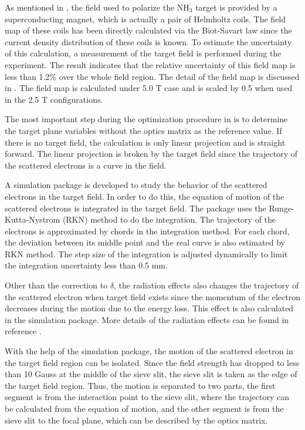 As mentioned in , the field used to polarize the NH${}_3$ target is provided by a superconducting magnet, which is actually a pair of Helmholtz coils. The field map of these coils has been directly calculated via the Biot-Savart law since the current density distribution of these coils is known. To estimate the uncertainty of this calculation, a measurement of the target field is performed during the experiment. The result indicates that the relative uncertainty of this field map is less than 1.2\% over the whole field region. The detail of the field map is discussed in . The field map is calculated under 5.0 T case and is scaled by 0.5 when used in the 2.5 T configurations.

The most important step during the optimization procedure in  is to determine the target plane variables without the optics matrix as the reference value. If there is no target field, the calculation is only linear projection and is straight forward. The linear projection is broken by the target field since the trajectory of the scattered electrons is a curve in the field.

A simulation package is developed to study the behavior of the scattered electrons in the target field. In order to do this, the equation of motion of the scattered electrons is integrated in the target field. The package uses the Runge-Kutta-Nystrom (RKN) method to do the integration. The trajectory of the electrons is approximated by chords in the integration method. For each chord, the deviation between its middle point and the real curve is also estimated by RKN method. The step size of the integration is adjusted dynamically to limit the integration uncertainty less than 0.5 mm.

Other than the correction to $\delta$, the radiation effects also changes the trajectory of the scattered electron when target field exists since the momentum of the electron decreases during the motion due to the energy loss. This effect is also calculated in the simulation package. More details of the radiation effects can be found in reference \cite{Liu2015}.

With the help of the simulation package, the motion of the scattered electron in the target field region can be isolated. Since the field strength has dropped to less than 10 Gauss at the middle of the sieve slit, the sieve slit is taken as the edge of the target field region. Thus, the motion is separated to two parts, the first segment is from the interaction point to the sieve slit, where the trajectory can be calculated from the equation of motion, and the other segment is from the sieve slit to the focal plane, which can be described by the optics matrix.

